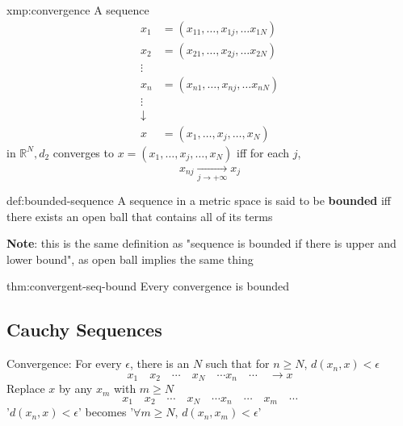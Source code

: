 \documentclass[landscape, 8pt]{extarticle}
\begin{document}
\begin{multicols}{3}
\begin{xmp}{xmp:convergence}{}
    A sequence
    \begin{align*}
        x_{1} &= (x_{11}, \dots,x_{1j}, \dots x_{1N}) \\
        x_{2} &= (x_{21}, \dots,x_{2j}, \dots x_{2N}) \\
        \vdots & \\
        x_{n} &= (x_{n1}, \dots,x_{nj}, \dots x_{nN}) \\
        \vdots \\
        \downarrow \\
        x &= (x_{1}, \dots, x_{j}, \dots, x_{N})
    \end{align*}
    in $\mathbb{R}^{N}, d_{2}$ converges to $x = (x_{1}, \dots, x_{j}, \dots, x_{N})$ iff for each $j$,
    \[x_{nj}\xrightarrow[j\to+\infty]{} x_{j}\]
\end{xmp}




\begin{dfn}{def:bounded-sequence}{}
    A sequence in a metric space is said to be \textbf{bounded} iff there exists an open ball that contains all of its terms

    \longrule{0.08ex}
    \textbf{Note}: this is the same definition as "sequence is bounded if there is upper and lower bound", as open ball implies the same thing
\end{dfn}


\begin{thm}[]{thm:convergent-seq-bound}{}
    Every convergence is bounded
\end{thm}

%
\subsection{Cauchy Sequences}
Convergence: For every $\epsilon$, there is an $N$ such that for $n\ge N$, $d(x_{n}, x) < \epsilon$
\[x_{1}\quad x_{2} \quad \cdots \quad x_{N} \quad \cdots x_{n} \quad \cdots \quad \to x\]
Replace $x$ by any $x_{m}$ with $m \ge N$
\[x_{1}\quad x_{2} \quad \cdots \quad x_{N} \quad \cdots x_{n} \quad \cdots \quad x_{m} \quad \cdots\]
'$d(x_{n}, x) < \epsilon$' becomes '$\forall m \ge N,\,d(x_{n}, x_{m}) < \epsilon$'


\end{multicols}
\end{document}
